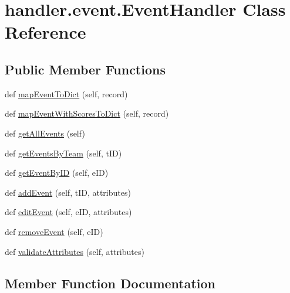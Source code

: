 \hypertarget{classhandler_1_1event_1_1_event_handler}{}\section{handler.\+event.\+Event\+Handler Class Reference}
\label{classhandler_1_1event_1_1_event_handler}
\subsection*{Public Member Functions}
\begin{DoxyCompactItemize}
\item 
def \hyperlink{classhandler_1_1event_1_1_event_handler_a5e837eb3451d29138a27d95b1ed7575d}{map\+Event\+To\+Dict} (self, record)
\item 
def \hyperlink{classhandler_1_1event_1_1_event_handler_a75d66da35627aebf7cc6cff5cb93f6e0}{map\+Event\+With\+Scores\+To\+Dict} (self, record)
\item 
def \hyperlink{classhandler_1_1event_1_1_event_handler_a5ea11d438c3a6c39524dcde68f87a6c2}{get\+All\+Events} (self)
\item 
def \hyperlink{classhandler_1_1event_1_1_event_handler_a0b5135c2269c49c58f165e428d7976fd}{get\+Events\+By\+Team} (self, t\+ID)
\item 
def \hyperlink{classhandler_1_1event_1_1_event_handler_ab5e4836ec9f0aea002d0be3f7227566e}{get\+Event\+By\+ID} (self, e\+ID)
\item 
def \hyperlink{classhandler_1_1event_1_1_event_handler_a6c97fb08cd641f3d2dd07a6b5afc0a37}{add\+Event} (self, t\+ID, attributes)
\item 
def \hyperlink{classhandler_1_1event_1_1_event_handler_a80dc5621cd54f90b135642db51183d7c}{edit\+Event} (self, e\+ID, attributes)
\item 
def \hyperlink{classhandler_1_1event_1_1_event_handler_a511281731fc33fae52d80e432680692d}{remove\+Event} (self, e\+ID)
\item 
def \hyperlink{classhandler_1_1event_1_1_event_handler_a75df7c2caab81a386ec89c6958070d35}{validate\+Attributes} (self, attributes)
\end{DoxyCompactItemize}


\subsection{Member Function Documentation}
\mbox{\label{classhandler_1_1event_1_1_event_handler_a6c97fb08cd641f3d2dd07a6b5afc0a37}} 
